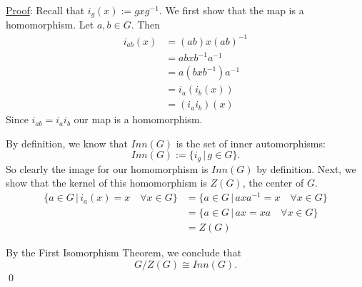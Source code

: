\documentclass{article}
\begin{document}
\underline{Proof}: Recall that $i_g(x) := gxg^{-1}$. We first show that the map is a homomorphism. Let $a, b \in G$. Then
\begin{align*}
	i_{ab}(x) &= (ab)x(ab)^{-1} \\
	&= abxb^{-1}a^{-1} \\
	&= a(bxb^{-1})a^{-1} \\
	&= i_a(i_b(x)) \\
	&= (i_ai_b)(x)
\end{align*}
Since $i_{ab} = i_ai_b$ our map is a homomorphism.

By definition, we know that $Inn(G)$ is the set of inner automorphisms:
$$Inn(G) := \{ i_g \, \vert \, g \in G \}.$$
So clearly the image for our homomorphism is $Inn(G)$ by definition. Next, we show that the kernel of this homomorphism is $Z(G)$, the center of $G$.
\begin{align*}
	\{ a \in G \, \vert \, i_a(x) = x \quad \forall x \in G \} &= \{  a \in G \, \vert \, axa^{-1} = x \quad \forall x \in G \} \\
	&=  \{  a \in G \, \vert \, ax = xa \quad \forall x \in G \} \\
	&= Z(G)
\end{align*}

By the First Isomorphism Theorem, we conclude that
$$G/Z(G) \cong Inn(G).$$ \qed \\
\end{document}
